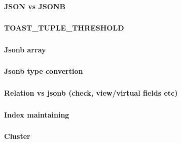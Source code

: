\documentclass[usenames,dvipsnames, 18pt, compress, aspectratio=169]{beamer}
\begin{document}
\begin{frame}
    \frametitle{}
    \begin{center}
        \textbf{JSON vs JSONB}
    \end{center}
\end{frame}

\begin{frame}
    \frametitle{}
    \begin{center}
        \textbf{TOAST\_TUPLE\_THRESHOLD}
    \end{center}
\end{frame}

\begin{frame}
    \frametitle{}
    \begin{center}
        \textbf{Jsonb array}
    \end{center}
\end{frame}

\begin{frame}
    \frametitle{}
    \begin{center}
        \textbf{Jsonb type convertion}
    \end{center}
\end{frame}

\begin{frame}
    \frametitle{}
    \begin{center}
        \textbf{Relation vs jsonb (check, view/virtual fields etc)}
    \end{center}
\end{frame}

\begin{frame}
    \frametitle{}
    \begin{center}
        \textbf{Index maintaining}
    \end{center}
\end{frame}

\begin{frame}
    \frametitle{}
    \begin{center}
        \textbf{Cluster}
    \end{center}
\end{frame}

\end{document}
